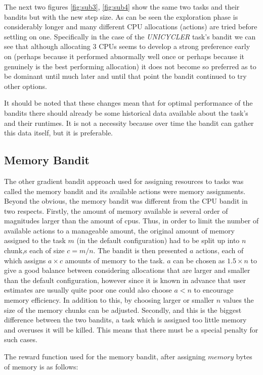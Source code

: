 The next two figures \ref{fig:sub3}, \ref{fig:sub4} show the same two tasks and their bandits but with the new step size. As can be seen the exploration phase is considerably longer and many different CPU allocations (actions) are tried before settling on one. Specifically in the case of the \textit{UNICYCLER} task’s bandit we can see that although allocating 3 CPUs seems to develop a strong preference early on (perhaps because it performed abnormally well once or perhaps because it genuinely is the best performing allocation) it does not become so preferred as to be dominant until much later and until that point the bandit continued to try other options.

It should be noted that these changes mean that for optimal performance of the bandits there should already be some historical data available about the task’s and their runtimes. It is not a necessity because over time the bandit can gather this data itself, but it is preferable.

\subsection{Memory Bandit}
\label{sub:mem_bandit}
The other gradient bandit approach used for assigning resources to tasks was called the memory bandit and its available actions were memory assignments. Beyond the obvious, the memory bandit was different from the CPU bandit in two respects. Firstly, the amount of memory available is several order of magnitudes larger than the amount of cpus. Thus, in order to limit the number of available actions to a manageable amount, the original amount of memory assigned to the task $m$ (in the default configuration) had to be split up into $n$ chunk,s each of size $c=m/n$. The bandit is then presented $a$ actions, each of which assigns $a\times c$ amounts of memory to the task. $a$ can be chosen as $1.5 \times n$ to give a good balance between considering allocations that are larger and smaller than the default configuration, however since it is known in advance that user estimates are usually quite poor one could also choose $a < n$ to encourage memory efficiency. In addition to this, by choosing larger or smaller $n$ values the size of the memory chunks can be adjusted. Secondly, and this is the biggest difference between the two bandits, a task which is assigned too little memory and overuses it will be killed. This means that there must be a special penalty for such cases.

The reward function used for the memory bandit, after assigning $memory$ bytes of memory is as follows:

